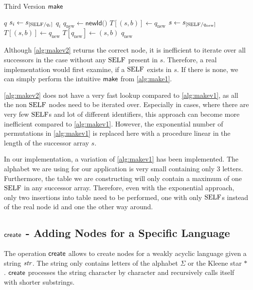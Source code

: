 \begin{algorithm}[H]
\caption{Third Version $\operatorname{\textsf{make}}$}\label{alg:makev2}
\begin{algorithmic}[1]\smallskip
{}
\Return $q$
\EndIf
{}
\State $s_{i} \gets s_{[\mathrm{SELF} / q_{i}]}$
\Return $q_{i}$
\EndIf
\EndFor
\State $q_{\text{new}} \gets \textsf{newId()}$
\State $T[(s,b)] \gets q_{\text{new}}$
\State $s \gets s_{[\mathrm{SELF} / q_{\text{new}}]}$
\State $T[(s,b)] \gets q_{\text{new}}$
\State $T[q_{\text{new}}] \gets (s,b)$
\Return $q_{\text{new}}$
\end{algorithmic}
\end{algorithm}


Although \autoref{alg:makev2} returns the correct node, it is inefficient to iterate over all successors in the case without any $\mathrm{SELF}$ present in $s$. Therefore, a real implementation would first examine, if a $\mathrm{SELF}$ exists in $s$. If there is none, we can simply perform the intuitive $\operatorname{\textsf{make}}$ from \autoref{alg:make1}.
\par 
\autoref{alg:makev2} does not have a very fast lookup compared to \autoref{alg:makev1}, as all the non $\mathrm{SELF}$ nodes need to be iterated over. Especially in cases, where there are very few $\mathrm{SELF}$s and lot of different identifiers, this approach can become more inefficient compared to \autoref{alg:makev1}. However, the exponential number of permutations in \autoref{alg:makev1} is replaced here with a procedure linear in the length of the successor array $s$.
\par 
In our implementation, a variation of \autoref{alg:makev1} has been implemented. The alphabet we are using for our application is very small containing only 3 letters. Furthermore, the table we are constructing will only contain a maximum of one $\mathrm{SELF}$ in any successor array. Therefore, even with the exponential approach, only two insertions into table need to be performed, one with only $\mathrm{SELF}$s instead of the real node id and one the other way around.

\subsection{$\operatorname{\textsf{create}}$ - Adding Nodes for a Specific Language}\label{sec:create}
The operation $\operatorname{\textsf{create}}$ allows to create nodes for a weakly acyclic language given a string $\mathit{str}$. The string only contains letters of the alphabet $\Sigma$ or the Kleene star $*$. $\operatorname{\textsf{create}}$ processes the string character by character and recursively calls itself with shorter substrings. 

